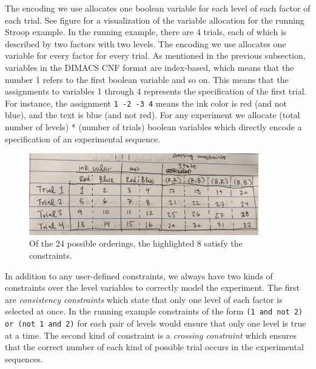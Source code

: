 The encoding we use allocates one boolean variable for each level of each factor of each trial. See figure  for a visualization of the variable allocation for the running Stroop example. In the running example, there are 4 trials, each of which is described by two factors with two levels. The encoding we use allocates one variable for every factor for every trial. As mentioned in the previous subsection, variables in the DIMACS CNF format are index-based, which means that the number 1 refers to the first boolean variable and so on. This means that the assignments to variables 1 through 4 represents the specification of the first trial. For instance, the assignment \texttt{1 -2 -3 4} means the ink color is red (and not blue), and the text is blue (and not red). For any experiment we allocate (total number of levels) * (number of trials) boolean variables which directly encode a specification of an experimental sequence.

\begin{figure}[t]
    \centerline{\includegraphics[origin=c,width=10cm]{stroop_crossing_vars}}
    \caption{Of the 24 possible orderings, the highlighted 8 satisfy the constraints.}%
    \label{fig:stroop_crossing_vars}%
\end{figure}

In addition to any user-defined constraints, we always have two kinds of constraints over the level variables to correctly model the experiment. The first are \emph{consistency constraints} which state that only one level of each factor is selected at once. In the running example constraints of the form \texttt{(1 and not 2) or (not 1 and 2)} for each pair of levels would ensure that only one level is true at a time. The second kind of constraint is a \emph{crossing constraint} which ensures that the correct number of each kind of possible trial occurs in the experimental sequences.

